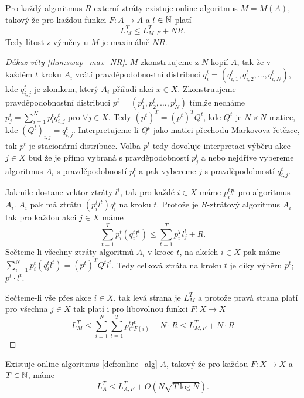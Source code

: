 \begin{theorem}\label{thm:swap_max_NR}
Pro každý algoritmus $R$-externí ztráty existuje online algoritmus $M=M(A)$, takový že pro každou funkci $F: A \rightarrow A$ a $t \in \mathbb{N}$ platí 
\[
    L^T_M \leq L^T_{M,F} + NR.
\]
Tedy lítost z výměny u $M$ je maximálně $NR$. 
\end{theorem}
\begin{proof}[Důkaz věty \ref{thm:swap_max_NR}]
    $M$ zkonstruujeme z $N$ kopií $A$, tak že v každém $t$ kroku $A_i$ vrátí pravděpodobnostní distribuci $q_i^t = (q^t_{i,1}, q^t_{i,2}, \dots, q^t_{i,N})$, kde $q^t_{i,j}$ je zlomkem, který $A_i$ přiřadí akci $x \in X$. 
    Zkonstruujeme pravděpodobnostní distribuci $p^t = (p^t_1, p^t_2, \dots, p^t_N)$ tím,že necháme $p^t_j = \sum^N_{i=1} p^t_i q^t_{i,j}$ pro $\forall j \in X$. 
    Tedy $(p^t)^T = (p^t)^T Q^t$, kde $Q^t$ je $N\times N$ matice, kde $(Q^t)_{i,j} = q^t_{i,j}$. 
    Interpretujeme-li $Q^t$ jako matici přechodu Markovova řetězce, tak $p^t$ je stacionární distribuce. 
    Volba $p^t$ tedy dovoluje interpretaci výběru akce $j\in X$ buď že je přímo vybraná s pravděpodobností $p^t_j$ a nebo nejdříve vybereme algoritmus $A_i$ s pravděpodobností $p^t_i$ a pak vybereme $j$ s pravděpodobností $q^t_{i,j}$. 

    Jakmile dostane vektor ztráty $l^t$, tak pro každé $i \in X$ máme $p_i^tl^t$ pro algoritmus $A_i$. 
    $A_i$ pak má ztrátu $(p^t_i l^t)q^t_i$ na kroku $t$. 
    Protože je $R$-ztrátový algoritmus $A_i$ tak pro každou akci $j \in X$ máme
    \[
        \sum^T_{t=1} p_i^t (q_i^t l^t) \leq \sum_{t=1}^T p_i^T l_j^t + R.
    \]
    Sečteme-li všechny ztráty algoritmů $A_i$ v kroce $t$, na akcích $i \in X$ pak máme $\sum^N_{i=1} p_i^t(q_i^t l^t) = (p^t)^T Q^t l^t$. 
    Tedy celková ztráta na kroku $t$ je díky výběru $p^t$; $p^t \cdot l^t$. 

    Sečteme-li vše přes akce $i \in X$, tak levá strana je $L^T_M$ a protože pravá strana platí pro všechna $j \in X$ tak platí i pro libovolnou funkci $F: X\rightarrow X$
    \[
        L_M^T \leq \sum^N_{i=1} \sum^T_{t=1} p_i^t l^t_{F(i)} + N\cdot R \leq L^T_{M,F} + N\cdot R 
    \]
\end{proof}
\begin{theorem}
\label{thm:swap_poly}
Existuje online algoritmus \ref{def:online_alg} $A$, takový že pro každou $F: X \rightarrow X$ a $T \in \mathbb{N}$, máme 
\[
    L^T_A \leq L^T_{A,F} + O(N \sqrt{T\log N}). 
\]
\end{theorem}


